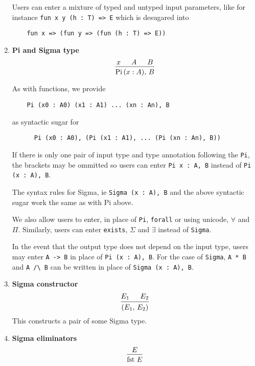 \documentclass{article}
\begin{document}
\begin{enumerate}
  Users can enter a mixture of typed and untyped input parameters, like for
  instance \verb|fun x y (h : T) => E|
  which is desugared into 
  \begin{verbatim}
    fun x => (fun y => (fun (h : T) => E))
  \end{verbatim}

\item \textbf{Pi and Sigma type} \\
  \[
    \begin{prooftree}
      \hypo{x}
      \hypo{A}
      \hypo{B}
      \infer3{\Pii \, (x : A), \, B}
    \end{prooftree}
 \]

  As with functions, we provide
  \begin{verbatim}
    Pi (x0 : A0) (x1 : A1) ... (xn : An), B
  \end{verbatim}

  as syntactic sugar for

  \begin{verbatim}
      Pi (x0 : A0), (Pi (x1 : A1), ... (Pi (xn : An), B))
  \end{verbatim}

  If there is only one pair of input type and type annotation following the \verb|Pi|,
  the brackets may be ommitted so users can enter \verb|Pi x : A, B| instead of
  \verb|Pi (x : A), B|.

  The syntax rules for Sigma, ie \verb|Sigma (x : A), B| and the above syntactic
  sugar work the same as with Pi above. 

  We also allow users to enter, in place of \verb|Pi|, \verb|forall| or using
  unicode, $\forall$ and $\Pi$.
  Similarly, users can enter \verb|exists|, $\Sigma$ and $\exists$ instead of
  \verb|Sigma|.

  In the event that the output type does not depend on the input type, users
  may enter \verb|A -> B| in place of \verb|Pi (x : A), B|.
  For the case of \verb|Sigma|, \verb|A * B| and \verb|A /\ B| can be written
  in place of \verb|Sigma (x : A), B|.

  \item \textbf{Sigma constructor} \\
  \[
    \begin{prooftree}
      \hypo{E_1}
      \hypo{E_2}
      \infer2{(E_1, \, E_2)}
    \end{prooftree}  
  \]
  This constructs a pair of some Sigma type.

  \item \textbf{Sigma eliminators} \\
  \[
    \begin{prooftree}
      \hypo{E}
      \infer1{\fst \, E}
    \end{prooftree}
  \]


\end{enumerate}
\end{document}
